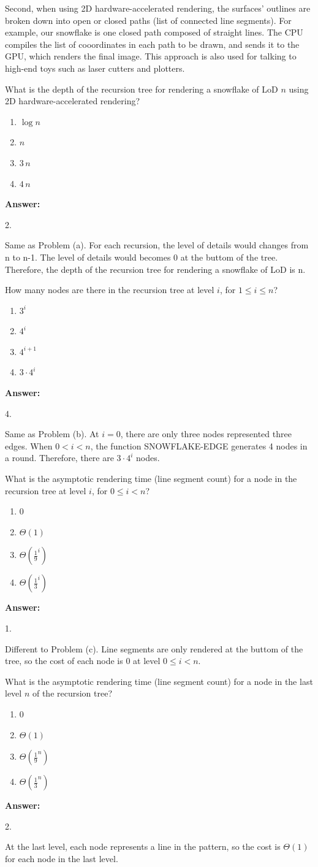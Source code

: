 \documentclass[12pt,twoside]{article}
\newcommand{\answer}{
 \par\medskip
 \textbf{Answer:}
}
\newcommand{\answerIf}{ \answer
{\color{blue}2. 

Same as Problem (a). For each recursion, the level of details would changes from n to n-1.
The level of details would becomes 0 at the buttom of the tree. Therefore, the 
depth of the recursion tree for rendering a snowflake of LoD is n.}
}
\newcommand{\answerIg}{ \answer
{\color{blue}4.

Same as Problem (b). At $i=0$, there are only three nodes represented three edges. When $0 < i < n$, 
the function SNOWFLAKE-EDGE generates 4 nodes in a round. Therefore, there are 
$3 \cdot 4^i$ nodes.}
}
\newcommand{\answerIh}{ \answer
{\color{blue}1.

Different to Problem (c). Line segments are only rendered 
at the buttom of the tree, so the cost of each node is 0 at 
level $0 \le i < n$.}
}
\newcommand{\answerIi}{ \answer
{\color{blue}2.

At the last level, each node represents a line in the pattern,
 so the cost is $\Theta(1)$ for each node in the last level.}
}
\begin{document}
\begin{problems}
Second, when using 2D hardware-accelerated rendering, the surfaces'
outlines are broken down into open or closed paths (list of connected
line segments). For example, our snowflake is one closed path composed of
straight lines. The CPU compiles the list of cooordinates in each path to be
drawn, and sends it to the GPU, which renders the final image. This approach is
also used for talking to high-end toys such as laser cutters and plotters.

\begin{problemparts}
  \problempart {} What is the depth of the recursion tree for rendering a
  snowflake of LoD $n$ using 2D hardware-accelerated rendering?
    \begin{enumerate}
      \item $\log n$
      \item $n$
      \item $3 \, n$
      \item $4 \, n$
    \end{enumerate}
\answerIf

  \problempart {} How many nodes are there in the recursion tree at level
  $i$, for $1 \le i \le n$?
    \begin{enumerate}
      \item $3 ^ i$
      \item $4 ^ i$
      \item $4 ^ {i + 1}$
      \item $3 \cdot 4 ^ i$
    \end{enumerate}
\answerIg

  \problempart {} What is the asymptotic rendering time (line segment count)
  for a node in the recursion tree at level $i$, for $0 \le i < n$?
    \begin{enumerate}
      \item $0$
      \item $\Theta(1)$
      \item $\Theta(\frac{1}{9}^i)$
      \item $\Theta(\frac{1}{3}^i)$
    \end{enumerate}
\answerIh

  \problempart {} What is the asymptotic rendering time (line segment count)
  for a node in the last level $n$ of the recursion tree?
    \begin{enumerate}
      \item $0$
      \item $\Theta(1)$
      \item $\Theta(\frac{1}{9}^n)$
      \item $\Theta(\frac{1}{3}^n)$
    \end{enumerate}
\answerIi


\end{problemparts}
\end{problems}
\end{document}
